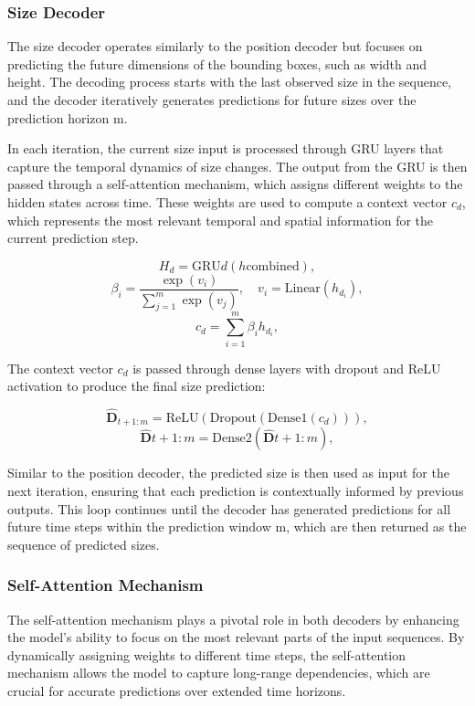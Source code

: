 \documentclass[12pt,oneside]{book} %
\begin{document}
\subsubsection{Size Decoder}
The size decoder operates similarly to the position decoder but focuses on
predicting the future dimensions of the bounding boxes, such as width and
height. The decoding process starts with the last observed size in the
sequence, and the decoder iteratively generates predictions for future sizes
over the prediction horizon m.

In each iteration, the current size input is processed through GRU layers that
capture the temporal dynamics of size changes. The output from the GRU is then
passed through a self-attention mechanism, which assigns different weights to
the hidden states across time. These weights are used to compute a context
vector $c_d$, which represents the most relevant temporal and spatial
information for the current prediction step.

\begin{equation}
    H_d = \text{GRU}d(h{\text{combined}}),
\end{equation}
\begin{equation}
    \beta_i = \frac{\exp(v_i)}{\sum_{j=1}^{m}\exp(v_j)}, \quad v_i = \text{Linear}(h_{d_i}),
\end{equation}
\begin{equation}
    c_d = \sum_{i=1}^{m} \beta_i h_{d_i},
\end{equation}

The context vector $c_d$ is passed through dense layers with dropout and ReLU
activation to produce the final size prediction:

\begin{equation}
    \hat{\mathbf{D}}_{t+1:m} = \text{ReLU}(\text{Dropout}(\text{Dense}1(c_d))),
\end{equation}
\begin{equation}
    \hat{\mathbf{D}}{t+1:m} = \text{Dense}2(\hat{\mathbf{D}}{t+1:m}),
\end{equation}

Similar to the position decoder, the predicted size is then used as input for
the next iteration, ensuring that each prediction is contextually informed by
previous outputs. This loop continues until the decoder has generated
predictions for all future time steps within the prediction window m, which are
then returned as the sequence of predicted sizes.

\subsubsection{Self-Attention Mechanism}
The self-attention mechanism plays a pivotal role in both decoders by enhancing
the model’s ability to focus on the most relevant parts of the input sequences.
By dynamically assigning weights to different time steps, the self-attention
mechanism allows the model to capture long-range dependencies, which are
crucial for accurate predictions over extended time horizons.
\end{document}
